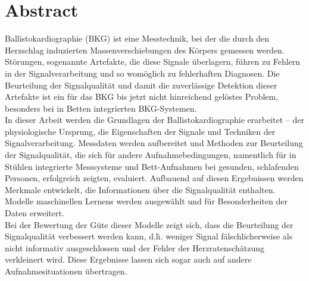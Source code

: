 \clearpage
\chapter*{Abstract}\label{abstract}


Ballistokardiographie (BKG) ist eine Messtechnik, bei der die durch den Herzschlag induzierten Massenverschiebungen des Körpers gemessen werden. Störungen, sogenannte Artefakte, die diese Signale überlagern, führen zu Fehlern in der Signalverarbeitung und so womöglich zu fehlerhaften Diagnosen. Die Beurteilung der Signalqualität und damit die zuverlässige Detektion dieser Artefakte ist ein für das BKG bis jetzt nicht hinreichend gelöstes Problem, besonders bei in Betten integrierten BKG-Systemen.\\ 
In dieser Arbeit werden die Grundlagen der Ballistokardiographie erarbeitet -- der physiologische Ursprung, die Eigenschaften der Signale und Techniken der Signalverarbeitung. Messdaten werden aufbereitet und Methoden zur Beurteilung der Signalqualität, die sich für andere Aufnahmebedingungen, namentlich für in Stühlen integrierte Messsysteme und Bett-Aufnahmen bei gesunden, schlafenden Personen,%
 erfolgreich zeigten, evaluiert. Aufbauend auf diesen Ergebnissen werden Merkmale entwickelt, die Informationen über die Signalqualität enthalten. Modelle maschinellen Lernens werden ausgewählt und für Besonderheiten der Daten erweitert.\\
Bei der Bewertung der Güte dieser Modelle zeigt sich, dass die Beurteilung der Signalqualität verbessert werden kann, d.\.h. weniger Signal fälschlicherweise als nicht informativ ausgeschlossen und der Fehler der Herzratenschätzung verkleinert wird. Diese Ergebnisse lassen sich sogar auch auf andere Aufnahmesituationen übertragen.

